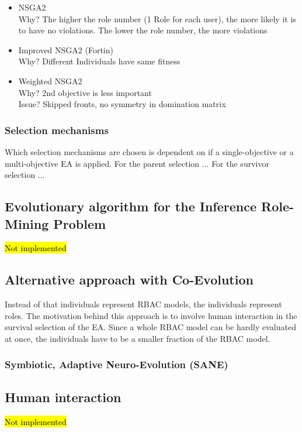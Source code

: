     \begin{itemize}
        \item NSGA2\\
        Why? The higher the role number (1 Role for each user), the more likely it is to have no violations. The lower the role number, the more violations
        \item Improved NSGA2 (Fortin)\\
        Why? Different Individuals have same fitness
        \item Weighted NSGA2\\
        Why? 2nd objective is less important\\
        Issue? Skipped fronts, no symmetry in domination matrix
    \end{itemize}
        
    \subsubsection{Selection mechanisms}
    Which selection mechanisms are chosen is dependent on if a single-objective or a multi-objective EA is applied.
    For the parent selection ...
    For the survivor selection ...
    
\subsection{Evolutionary algorithm for the Inference Role-Mining Problem}
\hl{Not implemented}

\subsection{Alternative approach with Co-Evolution}
Instead of that individuals represent RBAC models, the individuals represent roles. The motivation behind this approach is to involve human interaction in the survival selection of the EA. Since a whole RBAC model can be hardly evaluated at once, the individuals have to be a smaller fraction of the RBAC model.

    \subsubsection{Symbiotic, Adaptive Neuro-Evolution (SANE)}

\subsection{Human interaction}
\hl{Not implemented}
